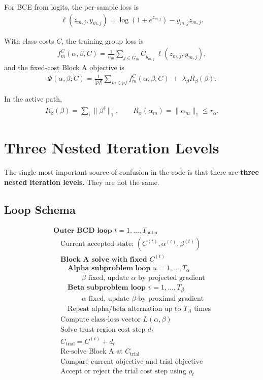 \documentclass[11pt]{article}
\begin{document}
For BCE from logits, the per-sample loss is
\begin{align}
\ell(z_{m,j}, y_{m,j}) = \log(1 + e^{z_{m,j}}) - y_{m,j} z_{m,j}.
\end{align}

With class costs $C$, the training group loss is
\begin{align}
f_m^C(\alpha,\beta,C)
=
\frac{1}{n_m}
\sum_{j \in G_m}
C_{y_{m,j}} \, \ell(z_{m,j}, y_{m,j}),
\end{align}
and the fixed-cost Block A objective is
\begin{align}
\Phi(\alpha,\beta;C)
=
\frac{1}{|pf|}
\sum_{m \in pf}
f_m^C(\alpha,\beta,C)
 \;+\; \lambda_\beta R_\beta(\beta).
\end{align}

In the active path,
\begin{align}
R_\beta(\beta) = \sum_i \|\beta^i\|_1,
\qquad
R_\alpha(\alpha_m) = \|\alpha_m\|_1 \le r_\alpha.
\end{align}

\section{Three Nested Iteration Levels}
The single most important source of confusion in the code is that there are
\textbf{three nested iteration levels}. They are not the same.

\subsection{Loop Schema}
\[
\boxed{
\begin{array}{l}
\textbf{Outer BCD loop } t = 1,\dots,T_{\mathrm{outer}} \\
\quad \text{Current accepted state: } (C^{(t)}, \alpha^{(t)}, \beta^{(t)}) \\
\quad \textbf{Block A solve with fixed } C^{(t)} \\
\qquad \textbf{Alpha subproblem loop } u = 1,\dots,T_\alpha \\
\qquad\qquad \beta \text{ fixed, update } \alpha \text{ by projected gradient} \\
\qquad \textbf{Beta subproblem loop } v = 1,\dots,T_\beta \\
\qquad\qquad \alpha \text{ fixed, update } \beta \text{ by proximal gradient} \\
\qquad \text{Repeat alpha/beta alternation up to } T_A \text{ times} \\
\quad \text{Compute class-loss vector } L(\alpha,\beta) \\
\quad \text{Solve trust-region cost step } d_t \\
\quad C_{\mathrm{trial}} = C^{(t)} + d_t \\
\quad \text{Re-solve Block A at } C_{\mathrm{trial}} \\
\quad \text{Compare current objective and trial objective} \\
\quad \text{Accept or reject the trial cost step using } \rho_t
\end{array}
}
\]
\end{document}
